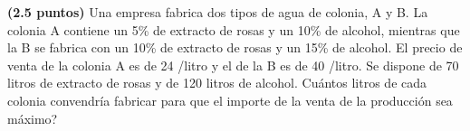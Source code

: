 
\textbf{(2.5 puntos)} Una empresa fabrica dos tipos de agua de colonia, A y B. La colonia A contiene un 5\% de extracto de rosas y un 10\% de alcohol, mientras que la B se fabrica con un 10\% de extracto de rosas y un 15\% de alcohol. El precio de venta de la colonia A es de 24 \texteuro{}/litro y el de la B es de 40 \texteuro{}/litro. Se dispone de 70 litros de extracto de rosas y de 120 litros de alcohol. \textquestiondown{}Cuántos litros de cada colonia convendría fabricar para que el importe de la venta de la producción sea máximo?
